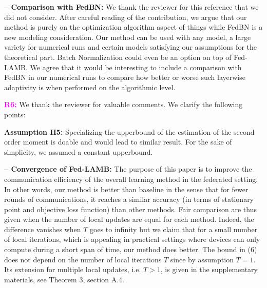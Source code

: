 \documentclass{article}
\begin{document}
\vspace{-2pt}
\textbf{-- Comparison with FedBN:} We thank the reviewer for this reference that we did not consider.
After careful reading of the contribution, we argue that our method is purely on the optimization algorithm aspect of things while FedBN is a new modeling consideration.
Our method can be used with any model, a large variety for numerical runs and certain models satisfying our assumptions for the theoretical part. 
Batch Normalization could even be an option on top of Fed-LAMB.
We agree that it would be interesting to include a comparison with FedBN in our numerical runs to compare how better or worse such layerwise adaptivity is when performed on the algorithmic level.


\textbf{\textcolor{magenta}{R6:}} We thank the reviewer for valuable comments. We clarify the following points: \vspace{-3pt}

\textbf{Assumption H5:} Specializing the upperbound of the estimation of the second order moment is doable and would lead to similar result. For the sake of simplicity, we assumed a constant upperbound.

\vspace{-2pt}
\textbf{-- Convergence of Fed-LAMB:} The purpose of this paper is to improve the communication efficiency of the overall learning method in the federated setting.
In other words, our method is better than baseline in the sense that for fewer rounds of communications, it reaches a similar accuracy (in terms of stationary point and objective loss function) than other methods.
Fair comparison are thus given when the number of local updates are equal for each method. 
Indeed, the difference vanishes when $T$ goes to infinity but we claim that for a small number of local iterations, which is appealing in practical settings where devices can only compute during a short span of time, our method does better.
The bound in (6) does not depend on the number of local iterations $T$ since by assumption $T=1$.
Its extension for multiple local updates, i.e. $T > 1$, is given in the supplementary materials, see Theorem 3, section A.4.

\end{document}
